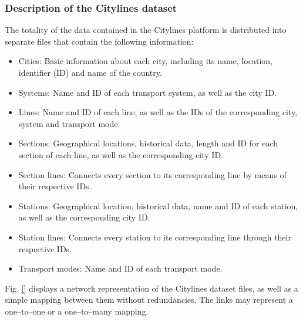 \subsubsection*{Description of the Citylines dataset}
The totality of the data contained in the Citylines platform is distributed into separate files that contain the following information:
\begin{itemize}
	\item Cities: Basic information about each city, including its name, location, identifier (ID) and name of the country.
	\item Systems: Name and ID of each transport system, as well as the city ID.
	\item Lines: Name and ID of each line, as well as the IDs of the corresponding city, system and transport mode.
	\item Sections: Geographical locations, historical data, length and ID for each section of each line, as well as the corresponding city ID.
	\item Section lines: Connects every section to its corresponding line by means of their respective IDs.
	\item Stations: Geographical location, historical data, name and ID of each station, as well as the corresponding city ID.
	\item Station lines: Connects every station to its corresponding line through their respective IDs.
	\item Transport modes: Name and ID of each transport mode.
\end{itemize}

Fig. \ref{} displays a network representation of the Citylines dataset files, as well as a simple mapping between them without redundancies. The links may represent a one--to--one or a one--to--many mapping.

\newpage


